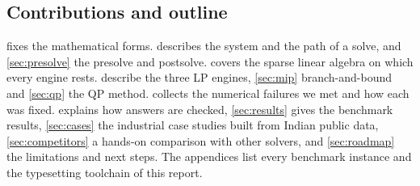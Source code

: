 \subsection{Contributions and outline}
 fixes the mathematical forms.  describes the system
and the path of a solve, and \cref{sec:presolve} the presolve and postsolve. 
covers the sparse linear algebra on which every engine rests. 
describe the three LP engines, \cref{sec:mip} branch-and-bound and \cref{sec:qp} the QP method.
 collects the numerical failures we met and how each was fixed.
 explains how answers are checked, \cref{sec:results} gives the benchmark
results, \cref{sec:cases} the industrial case studies built from Indian public data,
\cref{sec:competitors} a hands-on comparison with other solvers, and \cref{sec:roadmap} the
limitations and next steps. The appendices list every benchmark instance and the typesetting
toolchain of this report.
